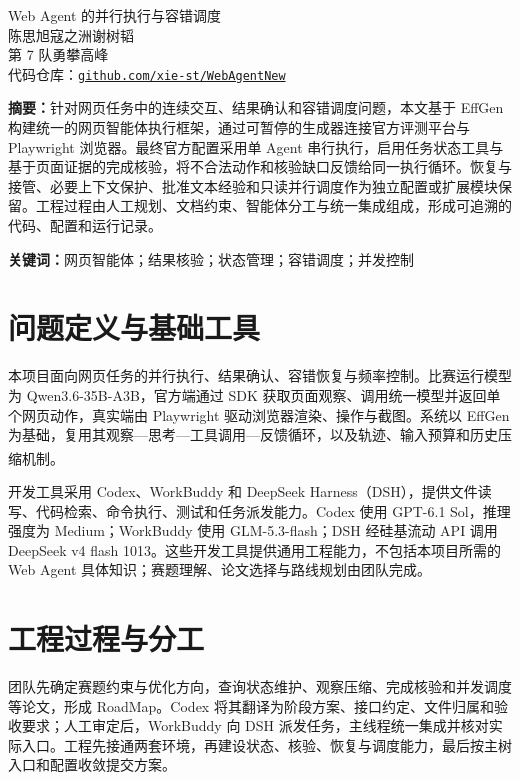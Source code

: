 \documentclass[UTF8,zihao=5,fontset=windows,a4paper]{ctexart}
\newcommand{\citepaper}[1]{\textsuperscript{\textcolor{blue}{\cite{#1}}}}
\begin{document}
\thispagestyle{plain}
\begin{center}
{\heiti\color{navy}\fontsize{18}{25}\selectfont Web Agent 的并行执行与容错调度}\\[10pt]
{\fontsize{11}{16}\selectfont 陈思旭\quad 寇之洲\quad 谢树韬}\\[3pt]
{\small 第 7 队\quad 勇攀高峰}\\[4pt]
{\footnotesize 代码仓库：\href{https://github.com/xie-st/WebAgentNew}{\texttt{github.com/xie-st/WebAgentNew}}}
\end{center}
\vspace{3pt}
\begingroup
\small
\noindent\textbf{摘要：}针对网页任务中的连续交互、结果确认和容错调度问题，本文基于 EffGen 构建统一的网页智能体执行框架，通过可暂停的生成器连接官方评测平台与 Playwright 浏览器。最终官方配置采用单 Agent 串行执行，启用任务状态工具与基于页面证据的完成核验，将不合法动作和核验缺口反馈给同一执行循环。恢复与接管、必要上下文保护、批准文本经验和只读并行调度作为独立配置或扩展模块保留。工程过程由人工规划、文档约束、智能体分工与统一集成组成，形成可追溯的代码、配置和运行记录。
\par\vspace{3pt}
\noindent\textbf{关键词：}网页智能体；结果核验；状态管理；容错调度；并发控制
\par
\endgroup
\vspace{4pt}
\section{问题定义与基础工具}

本项目面向网页任务的并行执行、结果确认、容错恢复与频率控制。比赛运行模型为 Qwen3.6-35B-A3B，官方端通过 SDK 获取页面观察、调用统一模型并返回单个网页动作，真实端由 Playwright 驱动浏览器渲染、操作与截图。系统以 EffGen 为基础，复用其观察—思考—工具调用—反馈循环，以及轨迹、输入预算和历史压缩机制。\citepaper{effgen}

开发工具采用 Codex、WorkBuddy 和 DeepSeek Harness（DSH），提供文件读写、代码检索、命令执行、测试和任务派发能力。Codex 使用 GPT-6.1 Sol，推理强度为 Medium；WorkBuddy 使用 GLM-5.3-flash；DSH 经硅基流动 API 调用 DeepSeek v4 flash 1013。这些开发工具提供通用工程能力，不包括本项目所需的 Web Agent 具体知识；赛题理解、论文选择与路线规划由团队完成。

\section{工程过程与分工}

团队先确定赛题约束与优化方向，查询状态维护、观察压缩、完成核验和并发调度等论文，形成 RoadMap。Codex 将其翻译为阶段方案、接口约定、文件归属和验收要求；人工审定后，WorkBuddy 向 DSH 派发任务，主线程统一集成并核对实际入口。工程先接通两套环境，再建设状态、核验、恢复与调度能力，最后按主树入口和配置收敛提交方案。
\end{document}
